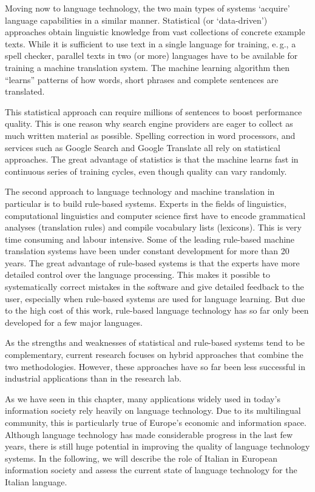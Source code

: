 \documentclass[]{../../metanetpaper}
\begin{document}
\begin{multicols}{2}
Moving now to language technology, the two main types of systems ‘acquire’
language capabilities in a similar manner. Statistical (or ‘data-driven’)
approaches obtain linguistic knowledge from vast collections of concrete
example texts. While it is sufficient to use text in a single language for
training, e.\,g., a spell checker, parallel texts in two (or more) languages
have to be available for training a machine translation system. The machine
learning algorithm then “learns” patterns of how words, short phrases and
complete sentences are translated. 

This statistical approach can require millions of sentences to boost
performance quality. This is one reason why
search engine providers are eager to collect as much written material as
possible. Spelling correction in word processors, and services such as Google
Search and Google Translate all rely on statistical approaches. The great
advantage of statistics is that the machine learns fast in continuous series
of training cycles, even though quality can vary randomly.

The second approach to language technology and machine translation in
particular is to build rule-based systems. Experts in the fields of
linguistics, computational linguistics and computer science first have to
encode grammatical analyses (translation rules) and compile vocabulary lists
(lexicons). This is very time consuming and labour intensive. Some of the
leading rule-based machine translation systems have been under constant
development for more than 20 years. The great advantage of rule-based
systems is that the experts have more detailed control over the language
processing. This makes it possible to systematically correct mistakes in the
software and give detailed feedback to the user, especially when rule-based
systems are used for language learning. But due to the high cost of this work,
rule-based language technology has so far only been developed for a few major
languages. 



As the strengths and weaknesses of statistical and rule-based systems tend to
be complementary, current research focuses on hybrid approaches that combine
the two methodologies. However, these approaches have so far been less
successful in industrial applications than in the research lab. 

As we have seen in this chapter, many applications widely used in today’s
information society rely heavily on language technology. Due to its
multilingual community, this is particularly true of Europe’s economic and
information space. Although language technology has made considerable progress
in the last few years, there is still huge potential in improving the quality
of language technology systems. In the following, we will describe the role of
Italian in European information society and assess the current state of
language technology for the Italian language.


\end{multicols}
\end{document}
